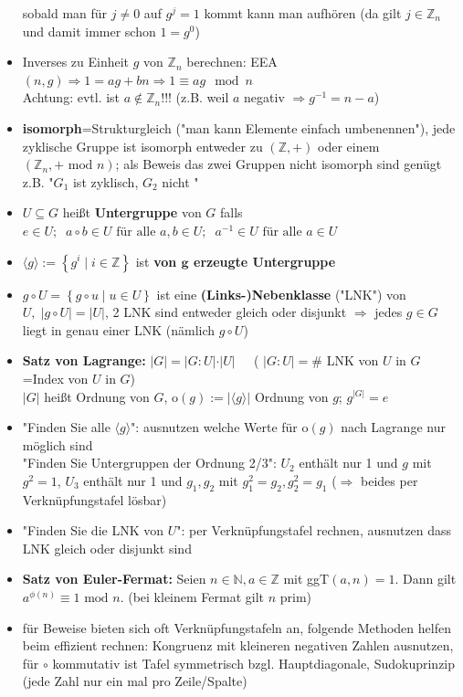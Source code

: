 \documentclass[10pt,a4paper]{article}
\begin{document}
\begin{itemize}
sobald man für $j\neq0$ auf $g^{j}=1$ kommt kann man aufhören (da gilt $j\in \mathbb{Z}_{n}$ und damit immer schon $1=g^{0}$)
\item Inverses zu Einheit $g$ von $\mathbb{Z}_{n}$ berechnen: EEA$(n,g)\Rightarrow 1=ag+bn\Rightarrow 1\equiv ag \mod n$\\
Achtung: evtl. ist $a\notin \mathbb{Z}_{n}$!!! (z.B. weil $a$ negativ $\Rightarrow g^{-1}=n-a$)
\item \textbf{isomorph}=Strukturgleich ("man kann Elemente einfach umbenennen"), jede zyklische Gruppe ist isomorph entweder zu $(\mathbb{Z},+)$ oder einem $(\mathbb{Z}_{n},+ \text{ mod } n)$; als Beweis das zwei Gruppen nicht isomorph sind genügt z.B. "$G_{1}$ ist zyklisch, $G_{2}$ nicht "
\item $U\subseteq G$ heißt \textbf{Untergruppe} von $G$ falls $e\in U;\;\; a\circ b \in U \text { für alle } a,b\in U;\;\; a^{-1} \in U \text{ für alle } a \in U$ 
\item $\langle g \rangle:=\left\lbrace g^{i}\mid i \in \mathbb{Z}\right\rbrace$ ist \textbf{von $\boldsymbol{g}$ erzeugte Untergruppe}
\item $g \circ U=\left\lbrace g\circ u \mid u \in U \right\rbrace$ ist eine \textbf{(Links-)Nebenklasse} ("LNK") von $U,\; \vert g\circ U\vert =\vert U\vert$, 2 LNK sind entweder gleich oder disjunkt $\Rightarrow$ jedes $g\in G$ liegt in genau einer LNK (nämlich $g\circ U$)
\item \textbf{Satz von Lagrange:} $\vert G \vert = \vert G : U \vert \cdot \vert U \vert\;\;\;\;$  ( $\vert G : U \vert=\#$ LNK von $U$ in $G$=Index von $U$ in $G$)\\ $\vert G \vert$ heißt Ordnung von $G$, o$(g):=\vert \langle g\rangle \vert$ Ordnung von $g$; $g^{\vert G\vert}=e$
\item "Finden Sie alle $\langle g \rangle$": ausnutzen welche Werte für o$(g)$ nach Lagrange nur möglich sind \\
"Finden Sie Untergruppen der Ordnung 2/3": $U_{2}$ enthält nur 1 und $g$ mit $g^{2}=1$, $U_{3}$ enthält nur 1 und $g_{1},g_{2}$ mit $g_{1}^{2}=g_{2},g_{2}^{2}=g_{1}$ ($\Rightarrow$  beides per Verknüpfungstafel lösbar)
\item "Finden Sie die LNK von $U$": per Verknüpfungstafel rechnen, ausnutzen dass LNK gleich oder disjunkt sind
\item \textbf{Satz von Euler-Fermat:} Seien $n\in \mathbb{N}, a\in \mathbb{Z}$ mit ggT$(a,n)=1$. Dann gilt $a^{\phi(n)}\equiv 1 \text{ mod } n$. (bei kleinem Fermat gilt $n$ prim)
\item für Beweise bieten sich oft Verknüpfungstafeln an, folgende Methoden helfen beim effizient rechnen: Kongruenz mit kleineren negativen Zahlen ausnutzen, für $\circ$ kommutativ ist Tafel symmetrisch bzgl. Hauptdiagonale, Sudokuprinzip (jede Zahl nur ein mal pro Zeile/Spalte)

\end{itemize}
\end{document}
